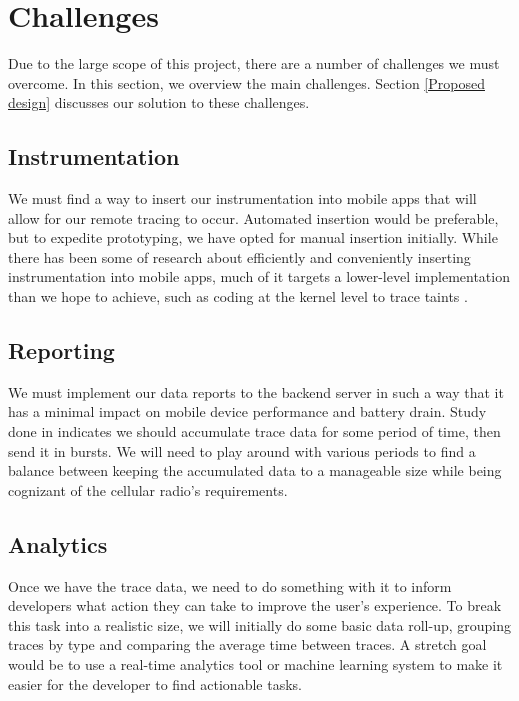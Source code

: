 \documentclass{acm_proc_article-sp}
\begin{document}
\section{Challenges}
Due to the large scope of this project, there are a number of challenges we must overcome.
In this section, we overview the main challenges. Section \ref{Proposed design} discusses
our solution to these challenges.

\subsection{Instrumentation}
We must find a way to insert our instrumentation into mobile apps that will
allow for our remote tracing to occur. Automated insertion would be preferable,
but to expedite prototyping, we have opted for manual insertion initially.
While there has been some of research about efficiently and conveniently inserting
instrumentation into mobile apps, much of it targets a lower-level implementation than
we hope to achieve, such as coding at the kernel level to trace taints \cite{TaintDroid}.

\subsection{Reporting}
We must implement our data reports to the backend server in such a way that it
has a minimal impact on mobile device performance and battery drain. Study done
in \cite{PeriodicTransfers} indicates we should accumulate trace data for some
period of time, then send it in bursts. We will need to play around with various
periods to find a balance between keeping the accumulated data to a manageable
size while being cognizant of the cellular radio's requirements.

\subsection{Analytics}
Once we have the trace data, we need to do something with it to inform developers
what action they can take to improve the user's experience. To break this task
into a realistic size, we will initially do some basic data roll-up, grouping
traces by type and comparing the average time between traces. A stretch goal
would be to use a real-time analytics tool or machine learning system 
to make it easier for the developer to find actionable tasks.
\end{document}
